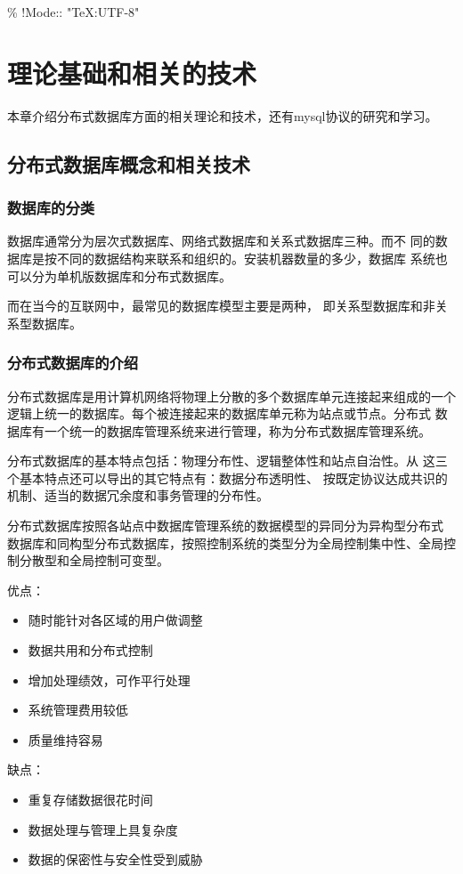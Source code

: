 \% !Mode:: "TeX:UTF-8"

\chapter{理论基础和相关的技术}
本章介绍分布式数据库方面的相关理论和技术，还有mysql协议的研究和学习。
\section{分布式数据库概念和相关技术}
\subsection{数据库的分类}
数据库通常分为层次式数据库、网络式数据库和关系式数据库三种。而不
同的数据库是按不同的数据结构来联系和组织的。安装机器数量的多少，数据库
系统也可以分为单机版数据库和分布式数据库。

而在当今的互联网中，最常见的数据库模型主要是两种，
即关系型数据库和非关系型数据库。
\subsection{分布式数据库的介绍}
分布式数据库是用计算机网络将物理上分散的多个数据库单元连接起来组成的一个
逻辑上统一的数据库。每个被连接起来的数据库单元称为站点或节点。分布式
数据库有一个统一的数据库管理系统来进行管理，称为分布式数据库管理系统。

分布式数据库的基本特点包括：物理分布性、逻辑整体性和站点自治性。从
这三个基本特点还可以导出的其它特点有：数据分布透明性、
按既定协议达成共识的机制、适当的数据冗余度和事务管理的分布性。

分布式数据库按照各站点中数据库管理系统的数据模型的异同分为异构型分布式
数据库和同构型分布式数据库，按照控制系统的类型分为全局控制集中性、全局控制分散型和全局控制可变型。

优点：
\begin{itemize}
\item 随时能针对各区域的用户做调整
\item 数据共用和分布式控制
\item 增加处理绩效，可作平行处理
\item 系统管理费用较低
\item 质量维持容易
\end{itemize}
缺点：
\begin{itemize}
\item 重复存储数据很花时间
\item 数据处理与管理上具复杂度
\item 数据的保密性与安全性受到威胁
\end{itemize}
